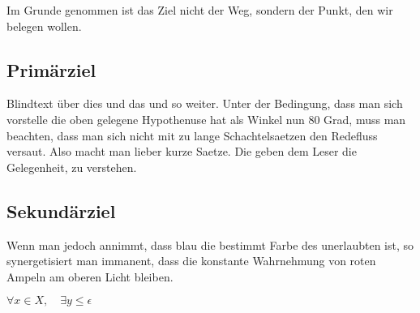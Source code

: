 Im Grunde genommen ist das Ziel nicht der Weg, sondern der Punkt, den wir belegen wollen.

\subsection{Prim\"arziel}
Blindtext \"uber dies und das und so weiter. Unter der Bedingung, dass man sich vorstelle die oben gelegene Hypothenuse hat als Winkel nun 80 Grad, muss man beachten, dass man sich nicht mit zu lange Schachtelsaetzen den Redefluss versaut.
Also macht man lieber kurze Saetze. Die geben dem Leser die Gelegenheit, zu verstehen.

\subsection{Sekund\"arziel}
Wenn man jedoch annimmt, dass blau die bestimmt Farbe des unerlaubten ist, so synergetisiert man immanent, dass die konstante Wahrnehmung von roten Ampeln am oberen Licht bleiben.\\

\begin{center}
$\forall x \in X, \quad \exists y \leq \epsilon$
\end{center}